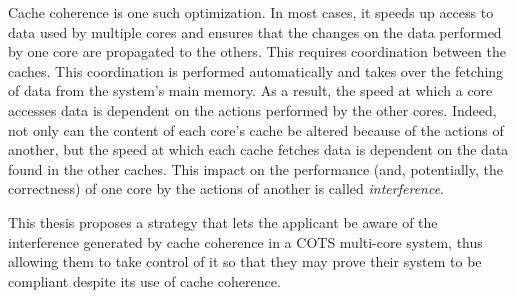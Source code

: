 Cache coherence is one such optimization. In most cases, it speeds up access to
data used by multiple cores and ensures that the changes on the data performed
by one core are propagated to the others. This requires coordination between
the caches. This coordination is performed automatically and takes over the
fetching of data from the system's main memory. As a result, the speed at which
a core accesses data is dependent on the actions performed by the other cores.
Indeed, not only can the content of each core's cache be altered because of the
actions of another, but the speed at which each cache fetches data is dependent
on the data found in the other caches. This impact on the performance (and,
potentially, the correctness) of one core by the actions of another is called
\textit{interference}.



This thesis proposes a strategy that lets the applicant be aware of
the interference generated by cache coherence in a COTS multi-core system, thus
allowing them to take control of it so that they may prove their system to be
compliant despite its use of cache coherence.

